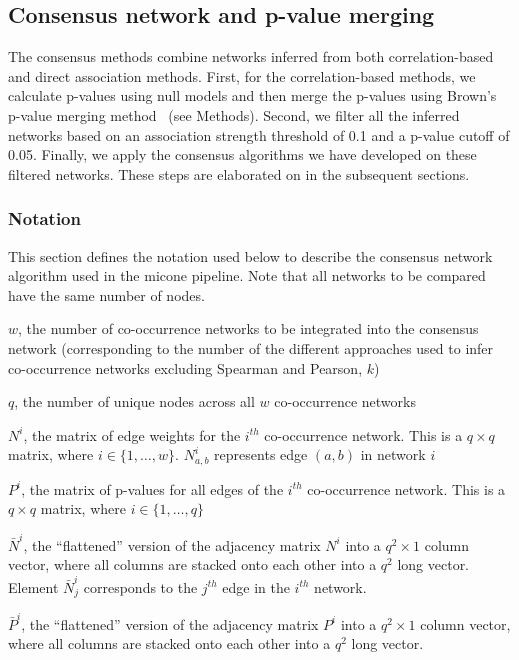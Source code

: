   \subsection*{Consensus network and p-value merging}
  The consensus methods combine networks inferred from both correlation-based and direct association methods. 
  First, for the correlation-based methods, we calculate p-values using null models and then merge the p-values using Brown's p-value merging method~\cite{Poole_Gibbs_Shmulevich_Bernard_Knijnenburg_2016,faustCoNetAppInference2016} (see Methods).
  Second, we filter all the inferred networks based on an association strength threshold of 0.1 and a p-value cutoff of 0.05.
  Finally, we apply the consensus algorithms we have developed on these filtered networks.
  These steps are elaborated on in the subsequent sections.

 \subsubsection*{Notation}
  \vspace{-5mm}
 This section defines the notation used below to describe the consensus network algorithm used in the \ac{micone} pipeline.
 Note that all networks to be compared have the same number of nodes.

  $w$, the number of co-occurrence networks to be integrated into the consensus network (corresponding to the number of the different approaches used to infer co-occurrence networks excluding Spearman and Pearson, $k$)

  $q$, the number of unique nodes across all $w$ co-occurrence networks

  $N^i$, the matrix of edge weights for the $i^{th}$ co-occurrence network.
  This is a $q \times q$ matrix, where $i \in \{1,\dots,w\}$.
  $N^i_{a,b}$ represents edge $(a,b)$ in network $i$

  $P^i$, the matrix of p-values for all edges of the $i^{th}$ co-occurrence network.
  This is a $q \times q$ matrix, where $i \in \{1,\dots,q\}$

  $\bar{N}^i$, the ``flattened'' version of the adjacency matrix $N^i$ into a $q^2 \times 1$ column vector, where all columns are stacked onto each other into a $q^2$ long vector.
  Element $\bar{N}^i_j$ corresponds to the $j^{th}$ edge in the $i^{th}$ network.

  $\bar{P}^i$, the ``flattened'' version of the adjacency matrix $P^i$ into a $q^2 \times 1$ column vector, where all columns are stacked onto each other into a $q^2$ long vector.

